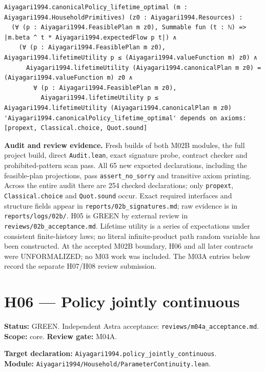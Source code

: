 \documentclass[
  11pt,
]{article}
\let\LedgerOriginalTexttt\texttt
\renewcommand{\texttt}[1]{{\small\LedgerOriginalTexttt{#1}}}
\begin{document}
\begin{verbatim}
Aiyagari1994.canonicalPolicy_lifetime_optimal (m : Aiyagari1994.HouseholdPrimitives) (z0 : Aiyagari1994.Resources) :
  (∀ (p : Aiyagari1994.FeasiblePlan m z0), Summable fun (t : ℕ) => |m.beta ^ t * Aiyagari1994.expectedFlow p t|) ∧
    (∀ (p : Aiyagari1994.FeasiblePlan m z0), Aiyagari1994.lifetimeUtility p ≤ (Aiyagari1994.valueFunction m) z0) ∧
      Aiyagari1994.lifetimeUtility (Aiyagari1994.canonicalPlan m z0) = (Aiyagari1994.valueFunction m) z0 ∧
        ∀ (p : Aiyagari1994.FeasiblePlan m z0),
          Aiyagari1994.lifetimeUtility p ≤ Aiyagari1994.lifetimeUtility (Aiyagari1994.canonicalPlan m z0)
'Aiyagari1994.canonicalPolicy_lifetime_optimal' depends on axioms: [propext, Classical.choice, Quot.sound]
\end{verbatim}

\textbf{Audit and review evidence.} Fresh builds of both M02B modules,
the full project build, direct \texttt{Audit.lean}, exact signature
probe, contract checker and prohibited-pattern scan pass. All 65 new
exported declarations, including the feasible-plan projections, pass
\texttt{assert\_no\_sorry} and transitive axiom printing. Across the
entire audit there are 254 checked declarations; only \texttt{propext},
\texttt{Classical.choice} and \texttt{Quot.sound} occur. Exact required
interfaces and structure fields appear in
\texttt{reports/02b\_signatures.md}; raw evidence is in
\texttt{reports/logs/02b/}. H05 is GREEN by external review in
\texttt{reviews/02b\_acceptance.md}. Lifetime utility is a series of
expectations under consistent finite-history laws; no literal
infinite-product path random variable has been constructed. At the
accepted M02B boundary, H06 and all later contracts were UNFORMALIZED;
no M03 work was included. The M03A entries below record the separate
H07/H08 review submission.

\newpage

\section{H06 --- Policy jointly
continuous}\label{h06-policy-jointly-continuous}

\textbf{Status:} GREEN. Independent Astra acceptance:
\texttt{reviews/m04a\_acceptance.md}. \textbf{Scope:} core.
\textbf{Review gate:} M04A.

\textbf{Target declaration:}
\texttt{Aiyagari1994.policy\_jointly\_continuous}.\\
\textbf{Module:}
\texttt{Aiyagari1994/Household/ParameterContinuity.lean}.
\end{document}
